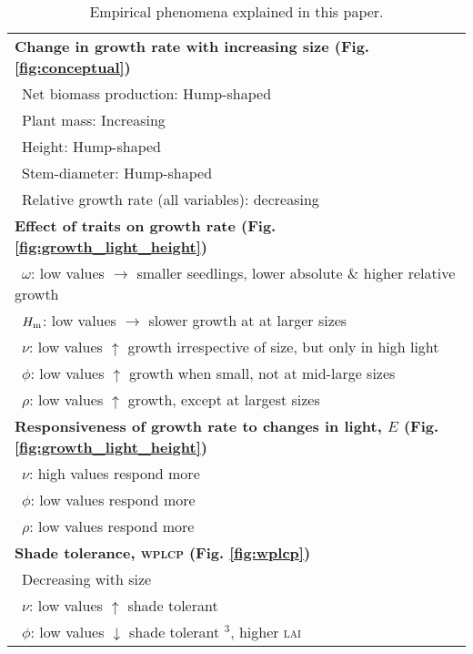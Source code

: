 \documentclass[9pt,twocolumn,twoside,lineno]{pnas-new}
\begin{document}
\begin{table}[!ht]
\caption{Empirical phenomena explained in this paper.}
\begin{tabular}{p{8cm}}
\toprule
\textbf{Change in growth rate with increasing size (Fig. \ref{fig:conceptual})}\\
 $\,$ Net biomass production: Hump-shaped \citep{Givnish-1988, Koch-2004} \\
 $\,$ Plant mass: Increasing \citep{Sillett-2010, Stephenson-2014} \\
 $\,$ Height: Hump-shaped \citep{Ryan-2006, Sillett-2010, King-2011} \\
 $\,$ Stem-diameter: Hump-shaped \citep{Canham-2004, Canham-2006, Herault-2011} \\
 $\,$ Relative growth rate (all variables): decreasing \citep{Rees-2010, Iida-2014}\\
\textbf{Effect of traits on growth rate (Fig. \ref{fig:growth_light_height})}\\
 $\,$ $\omega$: low values $\rightarrow$ smaller seedlings, lower absolute \& higher relative growth \citep{Gibert-2016} \\
 $\,$ $H_{\rm m}$: low values $\rightarrow$ slower growth at at larger sizes \citep{Gibert-2016}\\
 $\,$  $\nu$: low values $\uparrow$ growth irrespective of size, but only in high light \citep{Gibert-2016}\\
 $\,$ $\phi$: low values $\uparrow$ growth when small, not at mid-large sizes \citep{Gibert-2016}\\
 $\,$ $\rho$: low values $\uparrow$ growth, except at largest sizes \citep{Gibert-2016}\\
\textbf{Responsiveness of growth rate to changes in light, $E$ (Fig. \ref{fig:growth_light_height})}\\
 $\,$ $\nu$: high values respond more \\
 $\,$ $\phi$: low values respond more \\
 $\,$ $\rho$: low values respond more \citep{Ruger-2012}\\
\textbf{Shade tolerance, \textsc{wplcp} (Fig. \ref{fig:wplcp})}\\
 $\,$ Decreasing with size \citep{Givnish-1988, Kneeshaw-2006, Lusk-2008}\\
 $\,$ $\nu$: low values $\uparrow$ shade tolerant \citep{Messier-1999, Craine-2005,Baltzer-2007}\\
 $\,$ $\phi$: low values $\downarrow$ shade tolerant \citep{Messier-1999, Poorter-2006, Baltzer-2007, Lusk-2008}$^3$, higher \textsc{lai} \citep{Reich-1992, Gower-1993, Niinemets-2010} \\

\end{tabular}
\end{table}
\end{document}
